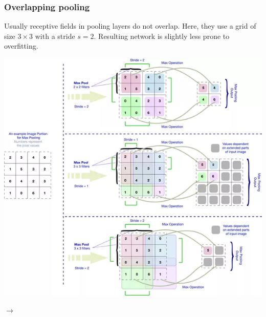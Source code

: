 \begin{frame}
	\frametitle{Overlapping pooling}

	Usually receptive fields in pooling layers do not overlap. Here, they use a grid of size $3 \times 3$ with a stride $s=2$. Resulting network is slightly less prone to overfitting.

	\medskip

	\begin{center}
		\includegraphics[scale=0.38]{figs/pooling_overlapping}
	\end{center}

\medskip

$\rightarrow$

\end{frame}



